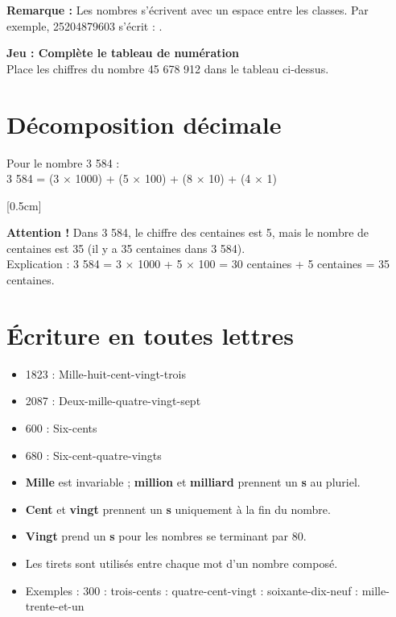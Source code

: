 \textbf{Remarque :} Les nombres s'écrivent avec un espace entre les classes. Par exemple, 25204879603 s'écrit : \trous{2.5cm}.

\begin{jeubox}
  \textbf{Jeu : Complète le tableau de numération} \\
  Place les chiffres du nombre 45 678 912 dans le tableau ci-dessus.
\end{jeubox}

\section{Décomposition décimale}

\begin{examplebox}
  Pour le nombre 3 584 : \\
  3 584 = (3 $\times$ 1000) + (5 $\times$ 100) + (8 $\times$ 10) + (4 $\times$ 1)
\end{examplebox}

[0.5cm]

\textbf{Attention !} Dans 3 584, le chiffre des centaines est 5, mais le nombre de centaines est 35 (il y a 35 centaines dans 3 584). \\
Explication : 3 584 = 3 $\times$ 1000 + 5 $\times$ 100 = 30 centaines + 5 centaines = 35 centaines.

\section{Écriture en toutes lettres}

\begin{examplebox}
  \begin{itemize}[label = \textbullet]
    \item 1823 : Mille-huit-cent-vingt-trois
    \item 2087 : Deux-mille-quatre-vingt-sept
    \item 600 : Six-cents
    \item 680 : Six-cent-quatre-vingts
  \end{itemize}
\end{examplebox}

\begin{proprietebox}
  \begin{itemize}
    \item \textbf{Mille} est invariable ; \textbf{million} et \textbf{milliard} prennent un \textbf{s} au pluriel.
    \item \textbf{Cent} et \textbf{vingt} prennent un \textbf{s} uniquement à la fin du nombre.
    \item \textbf{Vingt} prend un \textbf{s} pour les nombres se terminant par 80.
    \item Les tirets sont utilisés entre chaque mot d'un nombre composé.
    \item Exemples : 300 : trois-cents  : quatre-cent-vingt  : soixante-dix-neuf  : mille-trente-et-un
  \end{itemize}
\end{proprietebox}

